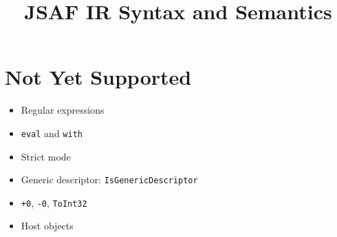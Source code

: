 \documentclass[a4paper, leqno]{amsart}
\begin{document}
\title{JSAF IR Syntax and Semantics}
\maketitle

\section{Not Yet Supported}
\begin{itemize}
\item Regular expressions
\item {\tt eval} and {\tt with}
\item Strict mode
\item Generic descriptor: {\tt IsGenericDescriptor}
\item {\tt +0}, {\tt -0}, {\tt ToInt32}
\item Host objects
\end{itemize}
\end{document}
